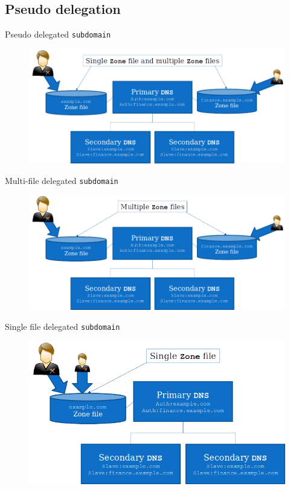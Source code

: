 \documentclass[xcolor=table,aspectratio=169]{beamer}
\begin{document}
\subsection{Pseudo delegation}
\begin{frame}{Pseudo delegated \texttt{subdomain}}
  \begin{figure}
    \begin{center}
      \includegraphics[width=1\linewidth]{PseudoDelegated.png}
    \end{center}
  \end{figure}
\end{frame}

\begin{frame}{Multi-file delegated \texttt{subdomain}}
  \begin{figure}
    \begin{center}
      \includegraphics[width=1\linewidth]{MultipleDelegated.png}
    \end{center}
  \end{figure}
\end{frame}

\begin{frame}{Single file delegated \texttt{subdomain}}
  \begin{figure}
    \begin{center}
      \includegraphics[width=0.8\linewidth]{SingleDelegated.png}
    \end{center}
  \end{figure}
\end{frame}
\end{document}
